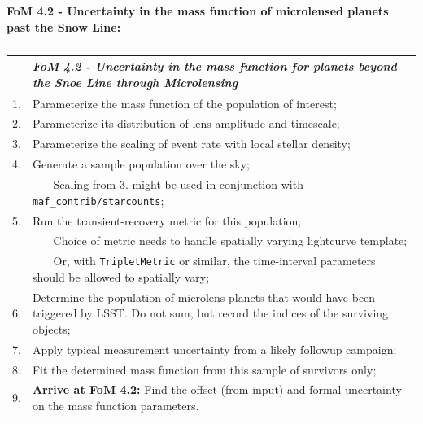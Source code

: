 {\bf FoM 4.2 - Uncertainty in the mass function of microlensed planets
  past the Snow Line:} 

\begin{table}[h]
  \small
  \begin{tabular}{c p{12cm}}
    & {\it FoM 4.2 - Uncertainty in the mass function for planets beyond the Snoe Line through Microlensing}\\
    \hline
  1. & Parameterize the mass function of the population of interest;\\
  2. & Parameterize its distribution of lens amplitude and timescale;\\
  3. & Parameterize the scaling of event rate with local stellar density;\\
  4. & Generate a sample population over the sky; \\
     & ~~~ Scaling from 3. might be used in conjunction with {\tt maf\_contrib/starcounts}; \\
  5. & Run the transient-recovery metric for this population; \\
     & ~~~ Choice of metric needs to handle spatially varying lightcurve template; \\
     & ~~~ Or, with {\tt TripletMetric} or similar, the time-interval parameters should be allowed to spatially vary; \\
  6. & Determine the population of microlens planets that would have been triggered by LSST. Do not sum, but record the indices of the surviving objects; \\
  7. & Apply typical measurement uncertainty from a likely followup campaign; \\
  8. & Fit the determined mass function from this sample of survivors only; \\
  9. & {\bf Arrive at FoM 4.2:} Find the offset (from input) and formal uncertainty on the mass function parameters.\\
\hline
    \end{tabular}
 \caption{}
  \label{table:pseudoFOM_4p2}
\end{table}


